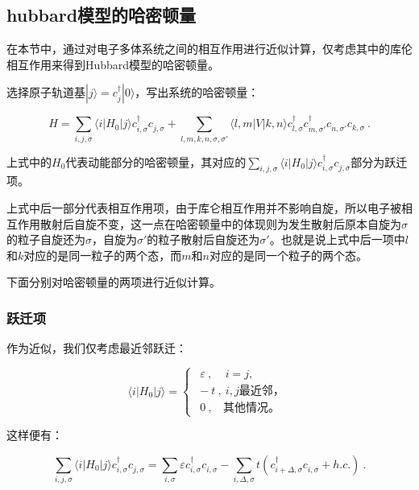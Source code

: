 

\subsection{hubbard模型的哈密顿量}

在本节中，通过对电子多体系统之间的相互作用进行近似计算，仅考虑其中的库伦相互作用来得到Hubbard模型的哈密顿量。

选择原子轨道基$|j\rangle =c_j^\dagger |0\rangle$，写出系统的哈密顿量：

\begin{equation}
H=\sum\limits_{i,j,\sigma}\langle i |H_0| j \rangle c_{i,\sigma}^\dagger c_{j,\sigma}^~+\sum\limits_{l,m,k,n,\sigma,\sigma'}\langle l,m|V|k,n\rangle c_{l,\sigma}^\dagger  c_{m,\sigma'}^\dagger c_{n,\sigma'}^~c_{k,\sigma}^~~.
\end{equation}

上式中的$H_0$代表动能部分的哈密顿量，其对应的$\sum\limits_{i,j,\sigma}\langle i |H_0| j \rangle c_{i,\sigma}^\dagger c_{j,\sigma}^~$部分为跃迁项。

上式中后一部分代表相互作用项，由于库仑相互作用并不影响自旋，所以电子被相互作用散射后自旋不变，这一点在哈密顿量中的体现则为发生散射后原本自旋为$\sigma$的粒子自旋还为$\sigma$，自旋为$
\sigma'$的粒子散射后自旋还为$\sigma'$。也就是说上式中后一项中$l$和$k$对应的是同一粒子的两个态，而$m$和$n$对应的是同一个粒子的两个态。

下面分别对哈密顿量的两项进行近似计算。

\subsubsection{跃迁项}
作为近似，我们仅考虑最近邻跃迁：

\begin{equation}
\langle i|H_0|j \rangle=\left\{
\begin{array}{lc}
~~\varepsilon~,~~~~~ i=j, \\
~-t~,~i,j\text{最近邻，} \\
~~0~,~~~~\text{其他情况。}
\end{array}\right.~
\end{equation}

这样便有：

\begin{equation}
\sum\limits_{i,j,\sigma}\langle i|H_0|j \rangle c_{i,\sigma}^\dagger c_{j,\sigma}^~=\sum\limits_{i,\sigma}\varepsilon c_{i,\sigma}^\dagger c_{i,\sigma}^~-\sum\limits_{i,\Delta,\sigma}t\left(c_{i+\Delta,\sigma}^\dagger c_{i,\sigma}^~+h.c.\right)~.
\end{equation}

